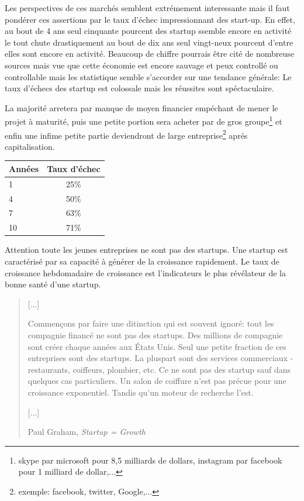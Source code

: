\documentclass[11pt, a4paper ]{article}
\begin{document}
Les perspectives de ces marchés semblent extrémement interessante mais il faut pondérer ces assertions par le taux d'échec impressionnant des start-up. En effet, au bout de 4 ans seul cinquante pourcent des startup ssemble encore en activité le tout chute drastiquement au bout de dix ans seul vingt-neux pourcent d'entre elles sont encore en activité.
Beaucoup de chiffre pourrais être cité de nombreuse sources mais vue que cette économie est encore sauvage et peux controllé ou controllable mais les statistique semble s'accorder sur une tendance générale: Le taux d'échecs des startup est colossale mais les réussites sont spéctaculaire.

La majorité  arretera par manque de moyen financier empéchant de mener le projet à maturité,  puis une petite portion sera acheter par de gros groupe\footnote{ skype par microsoft pour 8,5 milliards de dollars, instagram par facebook pour 1 milliard de dollar,... } et enfin une infime petite partie deviendront de large entreprise\footnote{exemple: facebook, twitter, Google,...} aprés capitalisation.

\begin{center}
\begin{tabular}{l*{1}{c}}
	Années  & Taux d'échec\\
	\hline
	1 & 25\% \\
	4 & 50\% \\
	7 & 63\% \\
	10 & 71\% \\
\end{tabular}\cite{statEchecStartup}
\end{center}

Attention toute les jeunes entreprises ne sont pas des startups. Une startup est caractérisé par sa capacité à générer de la croissance rapidement. Le taux de croissance hebdomadaire de croissance est l'indicateurs le plus révélateur de la bonne santé d'une startup.

\begin{quote}
	[...]

	Commençons par faire une ditinction qui est souvent ignoré: tout les compagnie financé ne sont pas des startups. Des millions de compagnie sont créer chaque années aux États Unis. Seul une petite fraction de ces entreprises sont des startups. La pluspart sont des services commerciaux - restaurants, coiffeurs, plombier, etc. Ce ne sont pas des startup sauf dans quelques cas particuliers. Un salon de coiffure n'est pas précue pour une croissance exponentiel. Tandis qu'un moteur de recherche l'est.

	[...]


	\caption{Paul Graham, \emph{Startup = Growth\cite{startupGrowth}}}
\end{quote}
\end{document}
